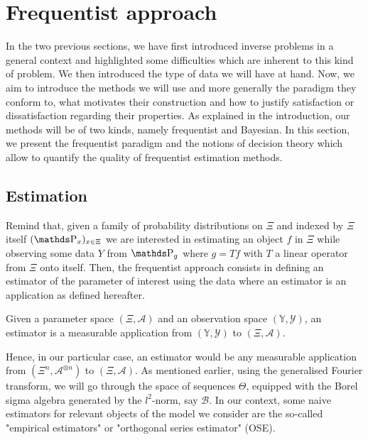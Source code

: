 \section{Frequentist approach}\label{INTRO_FREQ}
In the two previous sections, we have first introduced inverse problems in a general context and highlighted some difficulties which are inherent to this kind of problem.
We then introduced the type of data we will have at hand.
Now, we aim to introduce the methods we will use and more generally the paradigm they conform to, what motivates their construction and how to justify satisfaction or dissatisfaction regarding their properties.
As explained in the introduction, our methods will be of two kinds, namely frequentist and Bayesian.
In this section, we present the frequentist paradigm and the notions of decision theory which allow to quantify the quality of frequentist estimation methods.

\subsection{Estimation}\label{INTRO_FREQ_ESTIMATION}

Remind that, given a family of probability distributions on $\Xi$ and indexed by $\Xi$ itself $(\P_{x})_{x \in \Xi}$ we are interested in estimating an object $f$ in $\Xi$ while observing some data $Y$ from $\P_{g}$ where $g = Tf$ with $T$ a linear operator from $\Xi$ onto itself.
Then, the frequentist approach consists in defining an estimator of the parameter of interest using the data where an estimator is an application as defined hereafter.

\begin{de}
Given a parameter space $(\Xi, \mathcal{A})$ and an observation space $(\mathds{Y}, \mathcal{Y})$, an estimator is a measurable application from $(\mathds{Y}, \mathcal{Y})$ to $(\Xi, \mathcal{A})$.
\assEnd
\end{de}

Hence, in our particular case, an estimator would be any measurable application from $(\Xi^{n}, \mathcal{A}^{\otimes n})$ to $(\Xi, \mathcal{A})$.
As mentioned earlier, using the generalised Fourier transform, we will go through the space of sequences $\Theta$, equipped with the Borel sigma algebra generated by the $l^{2}$-norm, say $\mathcal{B}$.
In our context, some naive estimators for relevant objects of the model we consider are the so-called "empirical estimators" or "orthogonal series estimator" (OSE).

